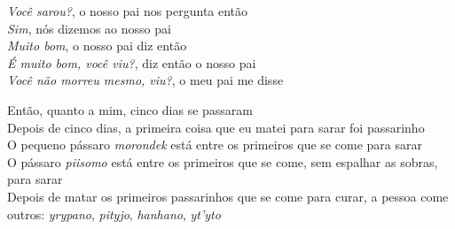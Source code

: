 \bigskip

\begin{linenumbers}\begingroup\raggedright
 
\noindent \emph{Você sarou?}, o nosso pai nos pergunta então\\
 \emph{Sim}, nós dizemos ao nosso pai\\
 \emph{Muito bom}, o nosso pai diz então\\
 \emph{É muito bom, você viu?}, diz então o nosso pai\\
 \emph{Você não morreu mesmo, viu?}, o meu pai me disse
 
\end{linenumbers}\endgroup

\bigskip

\begin{linenumbers}\begingroup\raggedright
 
\noindent Então, quanto a mim, cinco dias se passaram\\
 Depois de cinco dias, a primeira coisa que eu matei para sarar foi passarinho\\
 O pequeno pássaro \emph{morondek} está entre os primeiros que se come para sarar\\
 O pássaro \emph{piisomo} está entre os primeiros que se come, sem
 espalhar as sobras, para sarar\\
 Depois de matar os primeiros passarinhos que se come para curar, a
 pessoa come outros: \emph{yrypano}, \emph{pityjo}, \emph{hanhano},
 \emph{yt'yto}
 
\end{linenumbers}\endgroup

\bigskip

